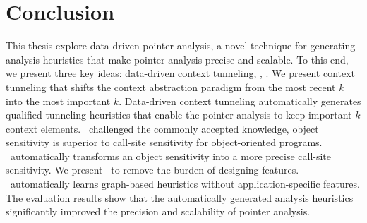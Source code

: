 \chapter{Conclusion}\label{sec:Conclusion}
This thesis explore data-driven pointer analysis, a novel technique for generating analysis heuristics that make pointer analysis precise and scalable. 
To this end, we present three key ideas: data-driven context tunneling, \ourtechnique, \Graphick. We present context tunneling that shifts the context abstraction paradigm from the most recent $k$ into the most important $k$.
Data-driven context tunneling automatically generates qualified tunneling heuristics that enable the pointer analysis to keep important $k$ context elements. \ourtechnique~challenged the commonly accepted knowledge, object sensitivity is superior to call-site sensitivity for object-oriented programs. \ourtechnique~automatically transforms an object sensitivity into a more precise call-site sensitivity. We present \Graphick~to remove the burden of designing features. \Graphick~automatically learns graph-based heuristics without application-specific features. The evaluation results show that the automatically generated analysis heuristics significantly improved the precision and scalability of pointer analysis. 









